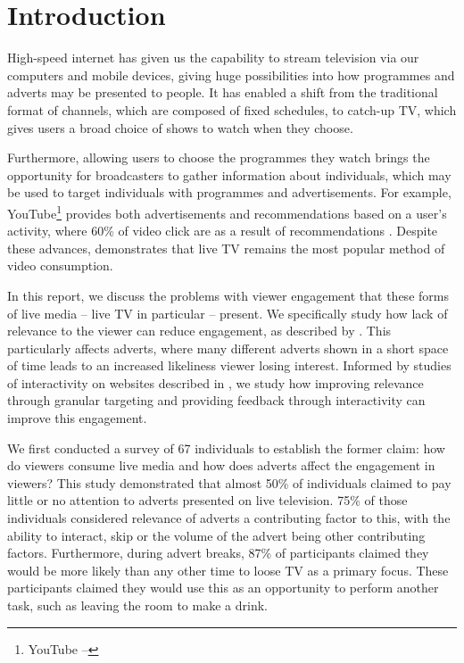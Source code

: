 \section{Introduction}
High-speed internet has given us the capability to stream television via our computers and mobile devices, giving huge possibilities into how programmes and adverts may be presented to people. It has enabled a shift from the traditional format of channels, which are composed of fixed schedules, to catch-up TV, which gives users a broad choice of shows to watch when they choose. 

Furthermore, allowing users to choose the programmes they watch brings the opportunity for broadcasters to gather information about individuals, which may be used to target individuals with programmes and advertisements. For example, YouTube\footnote{YouTube -- } provides both advertisements and recommendations based on a user's activity, where 60\% of video click are as a result of recommendations \citep{davidson2012}. Despite these advances, \citet{three-screen} demonstrates that live TV remains the most popular method of video consumption.

In this report, we discuss the problems with viewer engagement that these forms of live media -- live TV in particular -- present. We specifically study how lack of relevance to the viewer can reduce engagement, as described by \citet{plummer2006measures}. This particularly affects adverts, where many different adverts shown in a short space of time leads to an increased likeliness viewer losing interest. Informed by studies of interactivity on websites described in \citet{Teo2003281}, we study how improving relevance through granular targeting and providing feedback through interactivity can improve this engagement.

We first conducted a survey of 67 individuals to establish the former claim: how do viewers consume live media and how does adverts affect the engagement in viewers? This study demonstrated that almost 50\% of individuals claimed to pay little or no attention to adverts presented on live television. 75\% of those individuals considered relevance of adverts a contributing factor to this, with the ability to interact, skip or the volume of the advert being other contributing factors. Furthermore, during advert breaks, 87\% of participants claimed they would be more likely than any other time to loose TV as a primary focus. These participants claimed they would use this as an opportunity to perform another task, such as leaving the room to make a drink.


